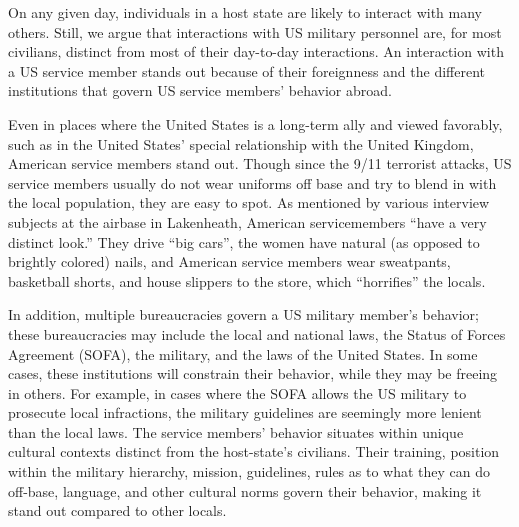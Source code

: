 
On any given day, individuals in a host state are likely to interact with many others. Still, we argue that interactions with US military personnel are, for most civilians, distinct from most of their day-to-day interactions. An interaction with a US service member stands out because of their foreignness and the different institutions that govern US service members' behavior abroad. 

Even in places where the United States is a long-term ally and viewed favorably, such as in the United States' special relationship with the United Kingdom, American service members stand out. Though since the 9/11 terrorist attacks, US service members usually do not wear uniforms off base and try to blend in with the local population, they are easy to spot. As mentioned by various interview subjects at the airbase in Lakenheath, American servicemembers ``have a very distinct look.'' They drive ``big cars'', the women have natural (as opposed to brightly colored) nails, and American service members wear sweatpants, basketball shorts, and house slippers to the store, which ``horrifies'' the locals.\autocite{rafone20190719,raftwo20190719,raffive20190719,rafeight20190719} 

In addition, multiple bureaucracies govern a US military member's behavior; these bureaucracies may include the local and national laws, the Status of Forces Agreement (SOFA), the military, and the laws of the United States. In some cases, these institutions will constrain their behavior, while they may be freeing in others. For example, in cases where the SOFA allows the US military to prosecute local infractions, the military guidelines are seemingly more lenient than the local laws. The service members' behavior situates within unique cultural contexts distinct from the host-state's civilians. Their training, position within the military hierarchy, mission, guidelines, rules as to what they can do off-base, language, and other cultural norms govern their behavior, making it stand out compared to other locals.  


